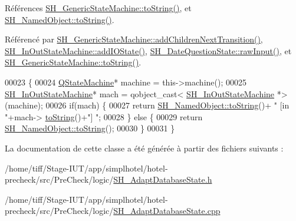Références \hyperlink{classSH__GenericStateMachine_a85c0c1c9d258ae991f84667412fa47cd}{S\-H\-\_\-\-Generic\-State\-Machine\-::to\-String()}, et \hyperlink{classSH__NamedObject_a9f4b19df6a96a17daaf1060b3019ef47}{S\-H\-\_\-\-Named\-Object\-::to\-String()}.



Référencé par \hyperlink{classSH__GenericStateMachine_a22433f8df2f41120a05bfa4bbfa9e0ae}{S\-H\-\_\-\-Generic\-State\-Machine\-::add\-Children\-Next\-Transition()}, \hyperlink{classSH__InOutStateMachine_a2528cffddbe6f98c32ebef41423c0118}{S\-H\-\_\-\-In\-Out\-State\-Machine\-::add\-I\-O\-State()}, \hyperlink{classSH__DateQuestionState_a71917e94cb9ce692f916a848bc8c8892}{S\-H\-\_\-\-Date\-Question\-State\-::raw\-Input()}, et \hyperlink{classSH__GenericStateMachine_a85c0c1c9d258ae991f84667412fa47cd}{S\-H\-\_\-\-Generic\-State\-Machine\-::to\-String()}.


\begin{DoxyCode}
00023 \{
00024     \hyperlink{classQStateMachine}{QStateMachine}* machine = this->machine();
00025     \hyperlink{classSH__InOutStateMachine}{SH\_InOutStateMachine}* mach = qobject\_cast<
      \hyperlink{classSH__InOutStateMachine}{SH\_InOutStateMachine} *>(machine);
00026     \textcolor{keywordflow}{if}(mach) \{
00027         \textcolor{keywordflow}{return} \hyperlink{classSH__NamedObject_a9f4b19df6a96a17daaf1060b3019ef47}{SH\_NamedObject::toString}()+ \textcolor{stringliteral}{" [in "}+mach->
      \hyperlink{classSH__GenericStateMachine_a85c0c1c9d258ae991f84667412fa47cd}{toString}()+\textcolor{stringliteral}{"] "};
00028     \} \textcolor{keywordflow}{else} \{
00029         \textcolor{keywordflow}{return} \hyperlink{classSH__NamedObject_a9f4b19df6a96a17daaf1060b3019ef47}{SH\_NamedObject::toString}();
00030     \}
00031 \}
\end{DoxyCode}


La documentation de cette classe a été générée à partir des fichiers suivants \-:\begin{DoxyCompactItemize}
\item 
/home/tiff/\-Stage-\/\-I\-U\-T/app/simplhotel/hotel-\/precheck/src/\-Pre\-Check/logic/\hyperlink{SH__AdaptDatabaseState_8h}{S\-H\-\_\-\-Adapt\-Database\-State.\-h}\item 
/home/tiff/\-Stage-\/\-I\-U\-T/app/simplhotel/hotel-\/precheck/src/\-Pre\-Check/logic/\hyperlink{SH__AdaptDatabaseState_8cpp}{S\-H\-\_\-\-Adapt\-Database\-State.\-cpp}\end{DoxyCompactItemize}
